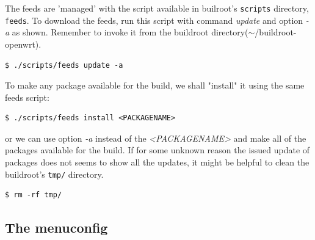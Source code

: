 The feeds are 'managed' with the script available in builroot's {\tt scripts} directory, {\tt feeds}.
To download the feeds, run this script with command {\it update} and option {\it -a} as shown.
Remember to invoke it from the buildroot directory($\sim$/buildroot-openwrt).
\begin{lstlisting}[columns=fixed,basicstyle=\ttfamily\footnotesize,tabsize=4,backgroundcolor=\color{yellow!10}]
$ ./scripts/feeds update -a
\end{lstlisting}
To make any package available for the build, we shall "install" it using the same feeds script:
\begin{lstlisting}[columns=fixed,basicstyle=\ttfamily\footnotesize,tabsize=4,backgroundcolor=\color{yellow!10}]
$ ./scripts/feeds install <PACKAGENAME>
\end{lstlisting}
or we can use option {\it -a} instead of the {\it <PACKAGENAME>} and make all of the packages available for the build.
If for some unknown reason the issued update of packages does not seems to show all the updates, it might be helpful to clean the buildroot's {\tt tmp/} directory\cite{feeds}.
\begin{lstlisting}[columns=fixed,basicstyle=\ttfamily\footnotesize,tabsize=4,backgroundcolor=\color{yellow!10}]
$ rm -rf tmp/
\end{lstlisting}

\subsection{The menuconfig}

